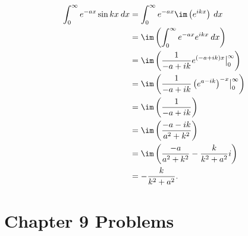 \documentclass[10pt]{mypackage}
\begin{document}
\begin{enumerate}[(a)]
    \begin{align*}
      \int_{0}^{\infty} e^{-ax}\sin kx\:dx &= \int_{0}^{\infty} e^{-ax}\im\left(e^{ikx}\right)\:dx\\
                                           &= \im \left(\int_{0}^{\infty} e^{-ax}e^{ikx}\:dx\right)\\
                                           &= \im \left(\frac{1}{-a+ik}e^{\left(-a + ik\right)x}\bigr\vert_{0}^{\infty}\right)\\
                                           &= \im \left(\frac{1}{-a + ik}\left(e^{a - ik}\right)^{-x}\bigr\vert_{0}^{\infty}\right)\\
                                           &= \im \left(\frac{1}{-a + ik}\right)\\
                                           &= \im \left(\frac{-a-ik}{a^2 + k^2}\right)\\
                                           &= \im \left(\frac{-a}{a^2 + k^2} - \frac{k}{k^2 + a^2}i\right)\\
                                           &= -\frac{k}{k^2 + a^2}.
    \end{align*}
\end{enumerate}
\section{Chapter 9 Problems}%
\end{document}
